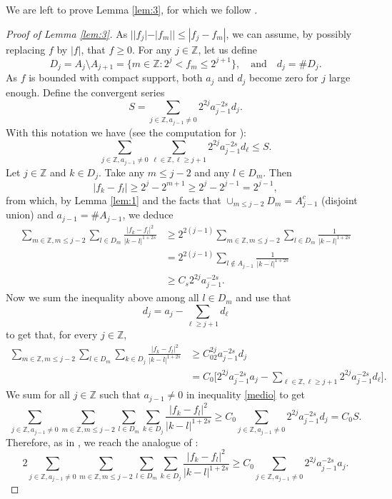 \documentclass[a4paper,11pt,reqno]{amsart}
\newcommand{\Z}{\mathbb{Z}}
\theoremstyle{definition}
\numberwithin{equation}{section}
\begin{document}
We are left to prove Lemma \ref{lem:3}, for which we follow \cite{Savin-Valdinoci-1}.

\begin{proof}[Proof of Lemma \ref{lem:3}]
As $||f_j|-|f_m||\leq|f_j-f_m|$, we can assume, by possibly replacing $f$ by $|f|$, that $f\geq0$.
For any $j\in\Z$, let us define
$$
D_j=A_j\setminus A_{j+1}=\{m\in\Z:2^j<f_m\leq2^{j+1}\},\quad\text{and}\quad d_j=\#D_j.
$$
As $f$ is bounded with compact support, both $a_j$ and $d_j$ become zero for $j$ large enough.
Define the convergent series
$$
S=\sum_{j\in\Z,a_{j-1}\neq0}2^{2j}a_{j-1}^{-2s}d_j.
$$
With this notation we have (see the computation for \cite[eq.~(32)]{Savin-Valdinoci-1}):
$$
\sum_{j\in\Z,a_{j-1}\neq0}\sum_{\ell\in\Z,\ell\geq j+1}2^{2j}a_{j-1}^{-2s}d_\ell\leq S.
$$
Let $j\in\Z$ and $k\in D_j$. Take any $m\leq j-2$ and any $l\in D_m$. Then
$$
|f_k-f_l|\geq 2^j-2^{m+1}\geq 2^j-2^{j-1}=2^{j-1},
$$
from which, by Lemma \ref{lem:1} and the facts that $\cup_{m\leq j-2}D_m=A_{j-1}^c$ (disjoint union) and
$a_{j-1}=\#A_{j-1}$, we deduce
\begin{align*}
\sum_{m\in\Z,m\leq j-2}\sum_{l\in D_m}\frac{|f_k-f_l|^2}{|k-l|^{1+2s}}
&\geq 2^{2(j-1)}\sum_{m\in\Z,m\leq j-2}\sum_{l\in D_m}
\frac{1}{|k-l|^{1+2s}} \\
&= 2^{2(j-1)}\sum_{l\notin A_{j-1}}\frac{1}{|k-l|^{1+2s}} \\
&\geq C_s2^{2j}a_{j-1}^{-2s}.
\end{align*}
Now we sum the inequality above among all $l\in D_m$ and use that
$$
d_j=a_j-\sum_{\ell\geq j+1}d_\ell
$$
to get that, for every $j\in\Z$,
\begin{align}
\sum_{m\in\Z,m\leq j-2}\sum_{l\in D_m}\sum_{k\in D_j}\frac{|f_k-f_l|^2}{|k-l|^{1+2s}}
&\geq C_02^{2j}a_{j-1}^{-2s}d_j \label{medio}\\
&= C_0\bigg[2^{2j}a_{j-1}^{-2s}a_j-\sum_{\ell\in\Z,\ell\geq j+1}2^{2j}a_{j-1}^{-2s}d_\ell\bigg].\nonumber
\end{align}
We sum for all $j\in\Z$ such that $a_{j-1}\neq0$ in inequality \eqref{medio} to get
$$
\sum_{j\in\Z,a_{j-1}\neq0} \sum_{m\in\Z,m\leq j-2}\sum_{l\in D_m}\sum_{k\in D_j}\frac{|f_k-f_l|^2}{|k-l|^{1+2s}}
\geq C_0\sum_{j\in\Z,a_{j-1}\neq0}2^{2j}a_{j-1}^{-2s}d_j=C_0S.
$$
Therefore, as in \cite[p.~2685]{Savin-Valdinoci-1}, we reach the analogue of
\cite[eq.~(36)]{Savin-Valdinoci-1}:
\begin{equation}
\label{cuenta}
2\sum_{j\in\Z,a_{j-1}\neq0}\sum_{m\in\Z,m\leq j-2}\sum_{l\in D_m}\sum_{k\in D_j}\frac{|f_k-f_l|^2}{|k-l|^{1+2s}}
\geq C_0\sum_{j\in\Z,a_{j-1}\neq0}2^{2j}a_{j-1}^{-2s}a_j.

\end{equation}
\end{proof}
\end{document}
